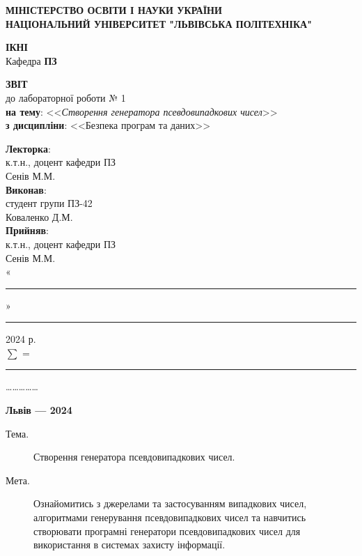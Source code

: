 \documentclass[oneside,14pt]{extarticle}
\newcommand\subject{Безпека програм та даних}
\newcommand\lecturer{к.т.н., доцент кафедри ПЗ\\Сенів М.М.}
\newcommand\teacher{к.т.н., доцент кафедри ПЗ\\Сенів М.М.}
\newcommand\mygroup{ПЗ-42}
\newcommand\lab{1}
\newcommand\theme{Створення генератора псевдовипадкових чисел}
\newcommand\purpose{Ознайомитись з джерелами та застосуванням випадкових
	чисел, алгоритмами генерування псевдовипадкових чисел та навчитись
	створювати програмні генератори псевдовипадкових чисел для використання в
	системах захисту інформації}
\begin{document}
\begin{normalsize}
	\begin{titlepage}
		\thispagestyle{empty}
		\begin{center}
			\textbf{МІНІСТЕРСТВО ОСВІТИ І НАУКИ УКРАЇНИ\\
				НАЦІОНАЛЬНИЙ УНІВЕРСИТЕТ "ЛЬВІВСЬКА ПОЛІТЕХНІКА"}
		\end{center}
		\begin{flushright}
			\textbf{ІКНІ}\\
			Кафедра \textbf{ПЗ}
		\end{flushright}
		\vspace{80pt}
		\begin{center}
			\textbf{ЗВІТ}\\
			\vspace{10pt}
			до лабораторної роботи № \lab\\
			\textbf{на тему}: <<\textit{\theme}>>\\
			\textbf{з дисципліни}: <<\subject>>
		\end{center}
		\vspace{80pt}
		\begin{flushright}
			
			\textbf{Лекторка}:\\
			\lecturer\\
			\vspace{28pt}
			\textbf{Виконав}:\\
			
			студент групи \mygroup\\
			Коваленко Д.М.\\
			\vspace{28pt}
			\textbf{Прийняв}:\\
			
			\teacher\\
			
			\vspace{28pt}
			«\rule{1cm}{0.15mm}» \rule{1.5cm}{0.15mm} 2024 р.\\
			$\sum$ = \rule{1cm}{0.15mm}……………\\
			
		\end{flushright}
		\vspace{\fill}
		\begin{center}
			\textbf{Львів — 2024}
		\end{center}
	\end{titlepage}
		
	\begin{description}
		\item[Тема.] \theme.
		\item[Мета.] \purpose.
	\end{description}


\end{normalsize}
\end{document}
